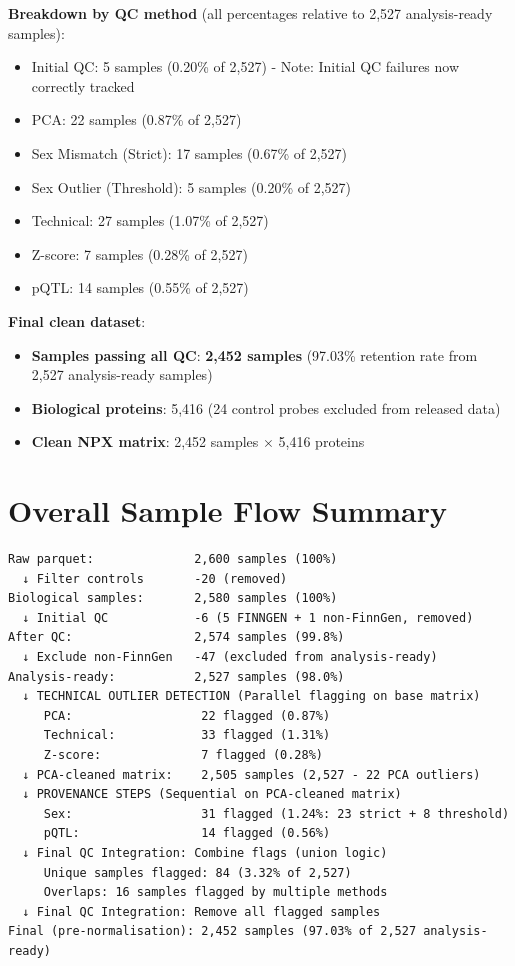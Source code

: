 \documentclass[11pt,a4paper]{article}
\begin{document}
\textbf{Breakdown by QC method} (all percentages relative to 2,527 analysis-ready samples):
\begin{itemize}
\item Initial QC: 5 samples (0.20\% of 2,527) - Note: Initial QC failures now correctly tracked
\item PCA: 22 samples (0.87\% of 2,527)
\item Sex Mismatch (Strict): 17 samples (0.67\% of 2,527)
\item Sex Outlier (Threshold): 5 samples (0.20\% of 2,527)
\item Technical: 27 samples (1.07\% of 2,527)
\item Z-score: 7 samples (0.28\% of 2,527)
\item pQTL: 14 samples (0.55\% of 2,527)
\end{itemize}

\textbf{Final clean dataset}:
\begin{itemize}
\item \textbf{Samples passing all QC}: \textbf{2,452 samples} (97.03\% retention rate from 2,527 analysis-ready samples)
\item \textbf{Biological proteins}: 5,416 (24 control probes excluded from released data)
\item \textbf{Clean NPX matrix}: 2,452 samples $\times$ 5,416 proteins
\end{itemize}

\section{Overall Sample Flow Summary}

\begin{tcolorbox}[colback=white,colframe=black,boxrule=1pt]
\begin{verbatim}
Raw parquet:              2,600 samples (100%)
  ↓ Filter controls       -20 (removed)
Biological samples:       2,580 samples (100%)
  ↓ Initial QC            -6 (5 FINNGEN + 1 non-FinnGen, removed)
After QC:                 2,574 samples (99.8%)
  ↓ Exclude non-FinnGen   -47 (excluded from analysis-ready)
Analysis-ready:           2,527 samples (98.0%)
  ↓ TECHNICAL OUTLIER DETECTION (Parallel flagging on base matrix)
     PCA:                  22 flagged (0.87%)
     Technical:            33 flagged (1.31%)
     Z-score:              7 flagged (0.28%)
  ↓ PCA-cleaned matrix:    2,505 samples (2,527 - 22 PCA outliers)
  ↓ PROVENANCE STEPS (Sequential on PCA-cleaned matrix)
     Sex:                  31 flagged (1.24%: 23 strict + 8 threshold)
     pQTL:                 14 flagged (0.56%)
  ↓ Final QC Integration: Combine flags (union logic)
     Unique samples flagged: 84 (3.32% of 2,527)
     Overlaps: 16 samples flagged by multiple methods
  ↓ Final QC Integration: Remove all flagged samples
Final (pre-normalisation): 2,452 samples (97.03% of 2,527 analysis-ready)
\end{verbatim}
\end{tcolorbox}
\end{document}
